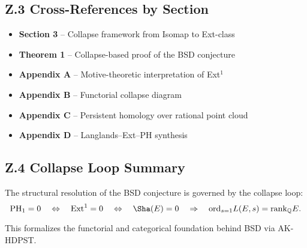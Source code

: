 \subsection*{Z.3 Cross-References by Section}

\begin{itemize}
  \item \textbf{Section 3} – Collapse framework from Isomap to Ext-class
  \item \textbf{Theorem 1} – Collapse-based proof of the BSD conjecture
  \item \textbf{Appendix A} – Motive-theoretic interpretation of Ext$^1$
  \item \textbf{Appendix B} – Functorial collapse diagram
  \item \textbf{Appendix C} – Persistent homology over rational point cloud
  \item \textbf{Appendix D} – Langlands–Ext–PH synthesis
\end{itemize}

\subsection*{Z.4 Collapse Loop Summary}

The structural resolution of the BSD conjecture is governed by the collapse loop:
\[
\mathrm{PH}_1 = 0 \quad \Leftrightarrow \quad \mathrm{Ext}^1 = 0 \quad \Leftrightarrow \quad \Sha(E) = 0 \quad \Rightarrow \quad \mathrm{ord}_{s=1}L(E,s) = \mathrm{rank}_\mathbb{Q}E.
\]

This formalizes the functorial and categorical foundation behind BSD via AK-HDPST.





